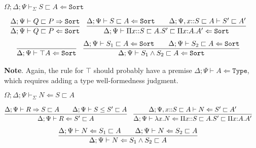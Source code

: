 \documentclass[letterpaper, 11pt]{article}
\newcommand{\Rar}{\Rightarrow}
\newcommand{\Lar}{\Leftarrow}
\newcommand{\Type}{\texttt{Type}}
\newcommand{\Sort}{\texttt{Sort}}
\begin{document}
    $\boxed{\Omega ; \Delta ; \Psi \vdash_\Sigma S \sqsubset A \Lar \Sort}$

    \begin{align*}
      & \infer{\Delta; \Psi \vdash Q \sqsubset P \Lar \Sort}
        {
          \Delta; \Psi \vdash Q \sqsubset P \Rar \Sort
        } &
      & \infer{\Delta; \Psi \vdash \Pi x{::}S \sqsubset A. S' \sqsubset \Pi x{:}A.A' \Lar \Sort}
        {
          \Delta; \Psi \vdash S \sqsubset A \Lar \Sort
          &&
          \Delta; \Psi, x{::}S \sqsubset A \vdash S' \sqsubset A'
        }
    \end{align*}
    \begin{align*}
      & \infer{\Delta; \Psi \vdash \top A \Lar \Sort}{} &
      & \infer{\Delta; \Psi \vdash S_1 \land S_2 \sqsubset A \Lar \Sort}
        {
          \Delta; \Psi \vdash S_1 \sqsubset A \Lar \Sort
          &&
          \Delta; \Psi \vdash S_2 \sqsubset A \Lar \Sort
        }
    \end{align*}

    \textbf{Note}.  Again, the rule for $\top$ should probably have a premise $\Delta; \Psi \vdash A \Lar \Type$, which requires adding
    a type well-formedness judgment.

    $\boxed{\Omega; \Delta; \Psi \vdash_\Sigma N \Lar S \sqsubset A}$

    \begin{align*}
      & \infer{\Delta; \Psi \vdash R \Lar S' \sqsubset A}
        {
          \Delta; \Psi \vdash R \Rar S \sqsubset A
          &&
          \Delta; \Psi \vdash S \leq S' \sqsubset A
        } &
      & \infer{\Delta; \Psi \vdash \lambda x.N \Lar \Pi x{::}S \sqsubset A.S' \sqsubset \Pi x{:}A.A'}
        {
          \Delta; \Psi, x{::}S \sqsubset A \vdash N \Lar S' \sqsubset A'
        }
    \end{align*}
    \begin{align*}
      & \infer{\Delta; \Psi \vdash N \Lar S_1 \land S_2 \sqsubset A}
        {
          \Delta; \Psi \vdash N \Lar S_1 \sqsubset A
          &&
          \Delta; \Psi \vdash N \Lar S_2 \sqsubset A
        }
    \end{align*}
\end{document}
